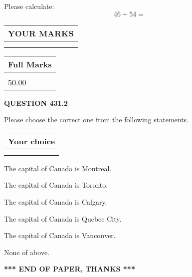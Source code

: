 \documentclass[12pt]{article}
\begin{document}
  
 
Please calculate:
\begin{equation}
46 +  %
54 = \nonumber
\end{equation}
 

 

 
  
\vspace{0.2in}
  
\noindent\begin{tabular}{|l|}
\hline
 YOUR MARKS  \\
\hline
 \\ 
 \\ 
\hline
\end{tabular}
\hspace{0.05in} \begin{tabular}{|l|}
\hline
 Full Marks  \\
\hline
 \\ 
50.00 \\
\hline
\end{tabular}
{\textbf{\Large{QUESTION
431.2 
}}}
  
  
Please choose the correct one from the following statements.
  
  
\noindent\hspace{3.0in} \begin{tabular}{|l|}
\hline
Your choice \\
\hline
 \\ 
 \\ 
\hline
\end{tabular}
  
  
 
 
The capital of Canada is Montreal.
 
 
The capital of Canada is Toronto.
 
 
The capital of Canada is Calgary.
 
 
The capital of Canada is Quebec City.
 
 
The capital of Canada is Vancouver.
 
 
 None of above.
 
 
   
   
 \vspace{0.2in}
 
   
   
   
   
\vspace{1.0in} 
{\textbf{\large{ *** END OF PAPER, THANKS *** }}} 
   
\end{document}
